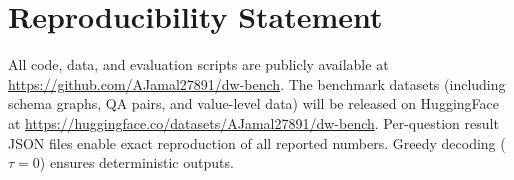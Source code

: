 \section{Reproducibility Statement}
\label{app:reproducibility}

All code, data, and evaluation scripts are publicly available at
\url{https://github.com/AJamal27891/dw-bench}. The benchmark datasets
(including schema graphs, QA pairs, and value-level data) will be released
on HuggingFace at \url{https://huggingface.co/datasets/AJamal27891/dw-bench}.
Per-question result JSON files enable exact reproduction of all reported
numbers. Greedy decoding ($\tau{=}0$) ensures deterministic outputs.
